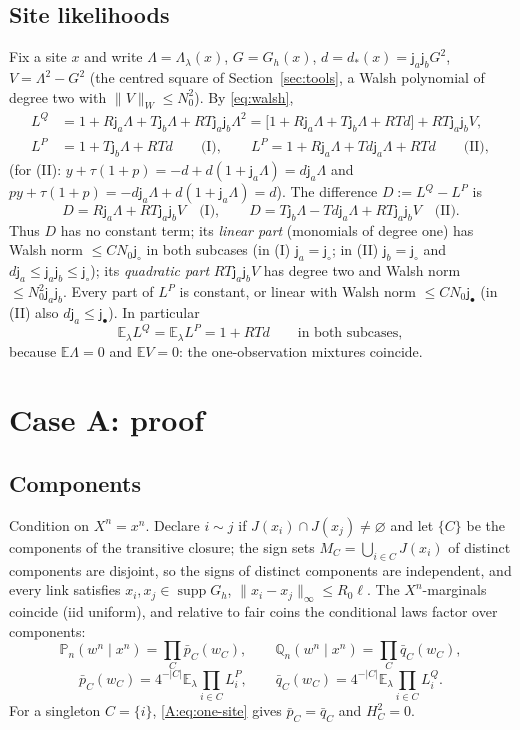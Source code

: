 \documentclass[11pt]{article}
\DeclareMathOperator{\supp}{supp}
\newcommand{\E}{\mathbb{E}}
\newcommand{\PP}{\mathbb{P}}
\newcommand{\norm}[1]{\lVert #1\rVert}
\newcommand{\abs}[1]{\lvert #1\rvert}
\newcommand{\ja}{\mathsf{j}_a}
\newcommand{\jb}{\mathsf{j}_b}
\newcommand{\jsh}{\mathsf{j}_\circ}
\newcommand{\jfi}{\mathsf{j}_\bullet}
\begin{document}
\subsection{Site likelihoods}
Fix a site \(x\) and write \(\Lambda=\Lambda_\lambda(x)\), \(G=G_h(x)\),
\(d=d_*(x)=\ja\jb G^2\), \(V=\Lambda^2-G^2\) (the centred square of
Section~\ref{sec:tools}, a Walsh polynomial of degree two with
\(\norm V_W\le N_0^2\)).  By \eqref{eq:walsh},
\begin{align}
 L^Q&=1+R\ja\Lambda+T\jb\Lambda+RT\ja\jb\Lambda^2
 =\bigl[1+R\ja\Lambda+T\jb\Lambda+RTd\bigr]+RT\ja\jb V,
 \label{A:eq:LQ}\\
 L^P&=1+T\jb\Lambda+RTd\qquad\text{(I)},\qquad
 L^P=1+R\ja\Lambda+Td\ja\Lambda+RTd\qquad\text{(II)},
 \label{A:eq:LP}
\end{align}
(for (II): \(y+\tau(1+p)=-d+d(1+\ja\Lambda)=d\ja\Lambda\) and
\(py+\tau(1+p)=-d\ja\Lambda+d(1+\ja\Lambda)=d\)).  The difference
\(D:=L^Q-L^P\) is
\begin{equation}
 D=R\ja\Lambda+RT\ja\jb V\quad\text{(I)},\qquad
 D=T\jb\Lambda-Td\ja\Lambda+RT\ja\jb V\quad\text{(II)}.
 \label{A:eq:D}
\end{equation}
Thus \(D\) has no constant term; its \emph{linear part} (monomials of
degree one) has Walsh norm \(\le CN_0\jsh\) in both subcases
(in (I) \(\ja=\jsh\); in (II) \(\jb=\jsh\) and \(d\ja\le\ja\jb\le\jsh\)); its
\emph{quadratic part} \(RT\ja\jb V\) has degree two and Walsh norm
\(\le N_0^2\ja\jb\).  Every part of \(L^P\) is constant, or linear with Walsh
norm \(\le CN_0\jfi\) (in (II) also \(d\ja\le\jfi\)).  In particular
\begin{equation}
 \E_\lambda L^Q=\E_\lambda L^P=1+RTd\qquad\text{in both subcases},
 \label{A:eq:one-site}
\end{equation}
because \(\E\Lambda=0\) and \(\E V=0\): the one-observation mixtures
coincide.

\section{Case A: proof}\label{A:sec:proof}

\subsection{Components}
Condition on \(X^n=x^n\).  Declare \(i\sim j\) if \(J(x_i)\cap J(x_j)\ne\varnothing\)
and let \(\{C\}\) be the components of the transitive closure; the sign
sets \(M_C=\bigcup_{i\in C}J(x_i)\) of distinct components are disjoint,
so the signs of distinct components are independent, and every link
satisfies \(x_i,x_j\in\supp G_h\), \(\norm{x_i-x_j}_\infty\le R_0\ell\).  The
\(X^n\)-marginals coincide (iid uniform), and relative to fair coins the
conditional laws factor over components:
\[
 \PP_n(w^n\mid x^n)=\prod_C\bar p_C(w_C),\qquad
 \mathbb Q_n(w^n\mid x^n)=\prod_C\bar q_C(w_C),
\]
\[
 \bar p_C(w_C)=4^{-\abs C}\E_\lambda\prod_{i\in C}L^P_i,\qquad
 \bar q_C(w_C)=4^{-\abs C}\E_\lambda\prod_{i\in C}L^Q_i .
\]
For a singleton \(C=\{i\}\), \eqref{A:eq:one-site} gives \(\bar p_C=\bar q_C\)
and \(H^2_C=0\).
\end{document}
